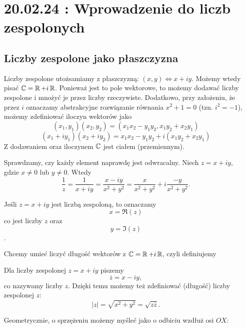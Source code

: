 \section{20.02.24 : Wprowadzenie do liczb zespolonych}

\subsection{Liczby zespolone jako płaszczyzna}

Liczby zespolone utożsamiamy z płaszczyzną: $(x,y)\iff x+iy$. Możemy wtedy pisać $\operatorname{\mathbb{C}}=\operatorname{\mathbb{R}}+i\operatorname{\mathbb{R}}$. Ponieważ jest to pole wektorowe, to możemy dodawać liczby zespolone i mnożyć je przez liczby rzeczywiste. Dodatkowo, przy założeniu, że przez $i$ oznaczamy abstrakcyjne rozwiązanie równania $x^2+1=0$ (tzn. $i^2=-1$), możemy zdefiniować iloczyn wektorów jako 
$$(x_1, y_1)(x_2, y_2)=(x_1x_2-y_1y_2, x_1y_2+x_2y_1)$$
$$(x_1+iy_1)(x_2+iy_2)=x_1x_2-y_1y_2+i(x_1y_2+x_2y_1)$$
Z dodawaniem oraz iloczynem $\operatorname{\mathbb{C}}$ jest ciałem (przemiennym).

Sprawdzamy, czy każdy element naprawdę jest odwracalny. Niech $z=x+iy$, gdzie $x\neq 0$ lub $y\neq 0$. Wtedy
$$\frac{1}{z}=\frac{1}{x+iy}=\frac{x-iy}{x^2+y^2}=\frac{x}{x^2+y^2}+i\frac{-y}{x^2+y^2}.$$

\begin{definition}
  Jeśli $z=x+iy$ jest liczbą zespoloną, to oznaczamy
  $$x=\Re (z)$$
  co jest  liczby $z$ oraz
  $$y=\Im(z)$$
  .
\end{definition}

Chcemy umieć liczyć długość wektorów z $\operatorname{\mathbb{C}}=\operatorname{\mathbb{R}}+i\operatorname{\mathbb{R}}$, czyli definiujemy
\begin{definition}
  Dla liczby zespolonej $z=x+iy$ piszemy
  $$\overline{z}=x-iy,$$
  co nazywamy  liczby $z$. Dzięki temu możemy też zdefiniować  (długość) liczby zespolonej $z$:
  $$|z|=\sqrt{x^2+y^2}=\sqrt{z\overline{z}}.$$
\end{definition}
Geometrycznie, o sprzężeniu możemy myśleć jako o odbiciu wzdłuż osi $OX$:
\begin{center}
\end{center}

